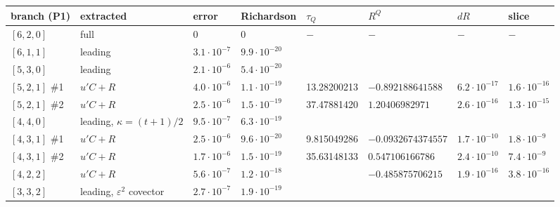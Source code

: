 \documentclass[10pt]{article}
\begin{document}
\begin{center}\footnotesize\setlength{\tabcolsep}{3pt}\begin{longtable}{@{}p{1.9cm}p{1.6cm}p{1.2cm}p{1.9cm}p{1.7cm}p{2.5cm}p{1.4cm}p{1.4cm}@{}}\toprule
\textbf{branch (P1)} & \textbf{extracted} & \textbf{error} & \textbf{Richardson} & \textbf{$\tau_Q$} & \textbf{$R^Q$} & \textbf{$dR$} & \textbf{slice} \\\midrule\endhead
$[6,2,0]$ & full & 0 & 0 & $-$ & $-$ & $-$ & $-$ \\
$[6,1,1]$ & leading & $3.1\cdot10^{-7}$ & $9.9\cdot10^{-20}$ &  &  &  &  \\
$[5,3,0]$ & leading & $2.1\cdot10^{-6}$ & $5.4\cdot10^{-20}$ &  &  &  &  \\
$[5,2,1]$ \#1 & $u'C+R$ & $4.0\cdot10^{-6}$ & $1.1\cdot10^{-19}$ & 13.28200213 & $-0.892188641588$ & $6.2\cdot10^{-17}$ & $1.6\cdot10^{-16}$ \\
$[5,2,1]$ \#2 & $u'C+R$ & $2.5\cdot10^{-6}$ & $1.5\cdot10^{-19}$ & 37.47881420 & $1.20406982971$ & $2.6\cdot10^{-16}$ & $1.3\cdot10^{-15}$ \\
$[4,4,0]$ & leading, $\kappa=(t+1)/2$ & $9.5\cdot10^{-7}$ & $6.3\cdot10^{-19}$ &  &  &  &  \\
$[4,3,1]$ \#1 & $u'C+R$ & $2.5\cdot10^{-6}$ & $9.6\cdot10^{-20}$ & 9.815049286 & $-0.0932674374557$ & $1.7\cdot10^{-10}$ & $1.8\cdot10^{-9}$ \\
$[4,3,1]$ \#2 & $u'C+R$ & $1.7\cdot10^{-6}$ & $1.5\cdot10^{-19}$ & 35.63148133 & $0.547106166786$ & $2.4\cdot10^{-10}$ & $7.4\cdot10^{-9}$ \\
$[4,2,2]$ & $u'C+R$ & $5.6\cdot10^{-7}$ & $1.2\cdot10^{-18}$ &  & $-0.485875706215$ & $1.9\cdot10^{-16}$ & $3.8\cdot10^{-16}$ \\
$[3,3,2]$ & leading, $\varepsilon^2$ covector & $2.7\cdot10^{-7}$ & $1.9\cdot10^{-19}$ &  &  &  &  \\
\bottomrule\end{longtable}\end{center}
\end{document}
